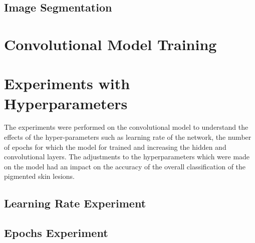 \subsection{ Image Segmentation }

\pagebreak
\section{Convolutional Model Training}


\pagebreak
\section{Experiments with Hyperparameters}
The experiments were performed on the convolutional model to understand the effects of the hyper-parameters 
such as learning rate of the network, the number of epochs for which the model for trained and increasing the hidden  
and convolutional layers. The adjustments to the hyperparameters which were made on the model had an impact on the accuracy of the overall classification of the pigmented skin lesions.
\subsection{Learning Rate Experiment}


\subsection{Epochs Experiment}


